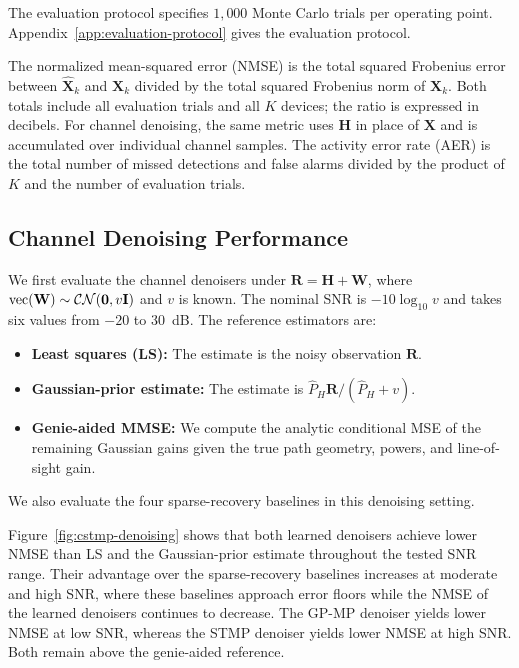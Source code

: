 The evaluation protocol specifies $1{,}000$ Monte Carlo trials per
operating point.
\ifdefined\FullManuscript
Appendix~\ref{app:evaluation-protocol} gives the evaluation protocol.
\fi

The normalized mean-squared error (NMSE) is the total squared
Frobenius error between $\widehat{\mathbf X}_k$ and $\mathbf X_k$
divided by the total squared Frobenius norm of $\mathbf X_k$.
Both totals include all evaluation trials and all $K$ devices;
the ratio is expressed in decibels. For channel denoising, the same
metric uses $\mathbf H$ in place of $\mathbf X$ and is accumulated
over individual channel samples. The activity error rate (AER) is the
total number of missed detections and false alarms divided by
the product of $K$ and the number of evaluation trials.

\subsection{Channel Denoising Performance}
\label{sec:denoising-performance}
We first evaluate the channel denoisers under
$\mathbf R=\mathbf H+\mathbf W$, where
$\operatorname{vec}(\mathbf W)\sim\mathcal{CN}(\mathbf0,v\mathbf{I})$ and $v$ is known.
The nominal SNR is $-10\log_{10}v$ and takes six values from
$-20$ to $30$~dB. The reference estimators are:
\begin{itemize}[leftmargin=*,topsep=2pt,itemsep=2pt,parsep=0pt]
\item \textbf{Least squares (LS):} The estimate is the noisy observation
$\mathbf R$.
\item \textbf{Gaussian-prior estimate:} The estimate is
$\widehat P_H\mathbf R/(\widehat P_H+v)$.
\item \textbf{Genie-aided MMSE:} We compute the analytic
conditional MSE of the remaining Gaussian gains given the true path
geometry, powers, and line-of-sight gain.
\end{itemize}
We also evaluate the four sparse-recovery baselines in this denoising
setting.

Figure~\ref{fig:cstmp-denoising} shows that both learned denoisers
achieve lower NMSE than LS and the Gaussian-prior estimate throughout
the tested SNR range. Their advantage over the sparse-recovery baselines
increases at moderate and high SNR, where these baselines approach error
floors while the NMSE of the learned denoisers continues to decrease.
The GP-MP denoiser yields lower NMSE at low SNR, whereas the STMP
denoiser yields lower NMSE at high SNR.
Both remain above the genie-aided reference.

